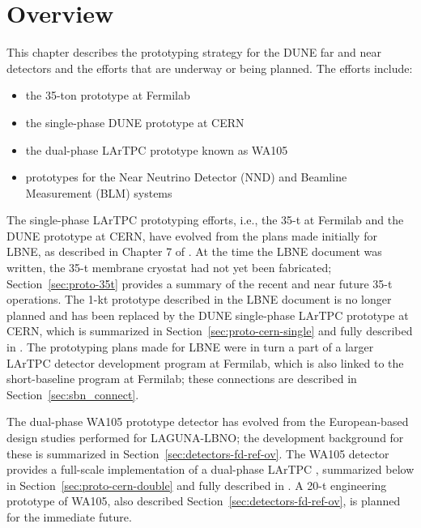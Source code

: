 \section{Overview}
\label{sec:proto-overview}


This chapter describes the prototyping strategy for the DUNE  far and near detectors and the efforts that are underway or being planned.  The efforts include:

\begin{itemize}
\item the 35-ton prototype at Fermilab
\item the single-phase DUNE prototype at CERN
\item the dual-phase LArTPC prototype known as WA105
\item prototypes for the Near Neutrino Detector (NND) and Beamline Measurement (BLM) systems
\end{itemize}

The single-phase LArTPC prototyping efforts, i.e., the 35-t at Fermilab and the DUNE prototype at CERN, have evolved from the plans made initially for LBNE, as described in Chapter 7 of \anxlbnefd.  At the time the LBNE document was written, the 35-t membrane cryostat had not yet been fabricated; Section~\ref{sec:proto-35t} provides a summary of the recent and near future 35-t operations.  The 1-kt prototype described in the LBNE document is no longer planned and has been replaced by the DUNE single-phase LArTPC prototype at CERN, which is summarized in Section~\ref{sec:proto-cern-single} and fully described in \anxcernproto.  The prototyping plans made for LBNE were in turn a part of a larger LArTPC detector development program at Fermilab, which is also linked to the short-baseline program at Fermilab; these connections are described in Section~\ref{sec:sbn_connect}.

The dual-phase WA105 prototype detector has evolved from the European-based design studies performed for LAGUNA-LBNO; the development background for these is summarized %
in Section~\ref{sec:detectors-fd-ref-ov}.  The WA105 detector provides a full-scale implementation of a dual-phase LArTPC , summarized below in Section~\ref{sec:proto-cern-double} and fully described in  \anxdualtdr.  A 20-t engineering prototype of WA105, also described Section~\ref{sec:detectors-fd-ref-ov}, %
is planned for the immediate future.

